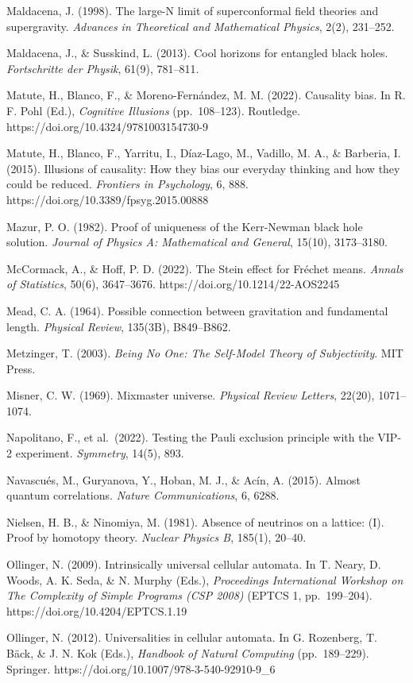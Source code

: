 \documentclass[
]{article}
\begin{document}
Maldacena, J. (1998). The large-N limit of superconformal field theories
and supergravity. \emph{Advances in Theoretical and Mathematical
Physics}, 2(2), 231--252.

Maldacena, J., \& Susskind, L. (2013). Cool horizons for entangled black
holes. \emph{Fortschritte der Physik}, 61(9), 781--811.

Matute, H., Blanco, F., \& Moreno-Fernández, M. M. (2022). Causality
bias. In R. F. Pohl (Ed.), \emph{Cognitive Illusions} (pp.~108--123).
Routledge. https://doi.org/10.4324/9781003154730-9

Matute, H., Blanco, F., Yarritu, I., Díaz-Lago, M., Vadillo, M. A., \&
Barberia, I. (2015). Illusions of causality: How they bias our everyday
thinking and how they could be reduced. \emph{Frontiers in Psychology},
6, 888. https://doi.org/10.3389/fpsyg.2015.00888

Mazur, P. O. (1982). Proof of uniqueness of the Kerr-Newman black hole
solution. \emph{Journal of Physics A: Mathematical and General}, 15(10),
3173--3180.

McCormack, A., \& Hoff, P. D. (2022). The Stein effect for Fréchet
means. \emph{Annals of Statistics}, 50(6), 3647--3676.
https://doi.org/10.1214/22-AOS2245

Mead, C. A. (1964). Possible connection between gravitation and
fundamental length. \emph{Physical Review}, 135(3B), B849--B862.

Metzinger, T. (2003). \emph{Being No One: The Self-Model Theory of
Subjectivity}. MIT Press.

Misner, C. W. (1969). Mixmaster universe. \emph{Physical Review
Letters}, 22(20), 1071--1074.

Napolitano, F., et al.~(2022). Testing the Pauli exclusion principle
with the VIP-2 experiment. \emph{Symmetry}, 14(5), 893.

Navascués, M., Guryanova, Y., Hoban, M. J., \& Acín, A. (2015). Almost
quantum correlations. \emph{Nature Communications}, 6, 6288.

Nielsen, H. B., \& Ninomiya, M. (1981). Absence of neutrinos on a
lattice: (I). Proof by homotopy theory. \emph{Nuclear Physics B},
185(1), 20--40.

Ollinger, N. (2009). Intrinsically universal cellular automata. In T.
Neary, D. Woods, A. K. Seda, \& N. Murphy (Eds.), \emph{Proceedings
International Workshop on The Complexity of Simple Programs (CSP 2008)}
(EPTCS 1, pp.~199--204). https://doi.org/10.4204/EPTCS.1.19

Ollinger, N. (2012). Universalities in cellular automata. In G.
Rozenberg, T. Bäck, \& J. N. Kok (Eds.), \emph{Handbook of Natural
Computing} (pp.~189--229). Springer.
https://doi.org/10.1007/978-3-540-92910-9\_6
\end{document}
